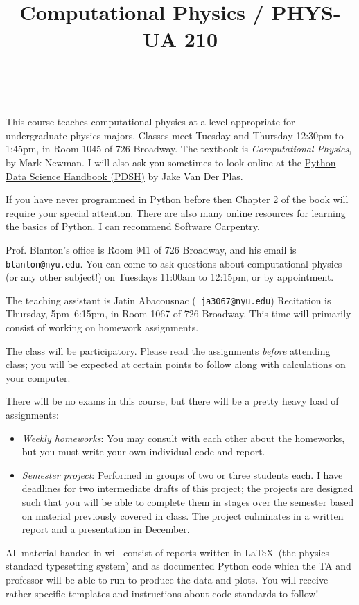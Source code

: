 \documentclass[11pt, preprint]{aastex}
\begin{document}
\title{\bf Computational Physics / PHYS-UA 210}
~
~

\noindent This course teaches computational physics at a level
appropriate for undergraduate physics majors.  Classes meet Tuesday
and Thursday 12:30pm to 1:45pm, in Room 1045 of 726 Broadway.  The
textbook is {\it Computational Physics}, by Mark Newman. I will also
ask you sometimes to look online at the
\href{https://jakevdp.github.io/PythonDataScienceHandbook/}{Python Data Science Handbook (PDSH)} by Jake Van Der Plas.

\noindent If you have never programmed in Python before then Chapter 2
of the book will require your special attention. There are also many
online resources for learning the basics of Python. I can recommend
Software Carpentry.

\noindent Prof. Blanton's office is Room 941 of 726 Broadway, and his
email is {\tt blanton@nyu.edu}. You can come to ask questions about
computational physics (or any other subject!) on Tuesdays 11:00am to
12:15pm, or by appointment.

\noindent The teaching assistant is Jatin Abacousnac ({\tt
  ja3067@nyu.edu}) Recitation is Thursday, 5pm--6:15pm, in Room 1067
of 726 Broadway. This time will primarily consist of working on
homework assignments.

\noindent The class will be participatory. Please read the assignments
          {\it before} attending class; you will be expected at
          certain points to follow along with calculations on your
          computer.

\noindent There will be no exams in this course, but there will be a
pretty heavy load of assignments:
\begin{itemize}
\item {\it Weekly homeworks}: You may consult with each other about
  the homeworks, but you must write your own individual code and
  report.
\item {\it Semester project}: Performed in groups of two or three
  students each. I have deadlines for two intermediate drafts of this
  project; the projects are designed such that you will be able to
  complete them in stages over the semester based on material
  previously covered in class. The project culminates in a written
  report and a presentation in December.
\end{itemize}
All material handed in will consist of reports written in \LaTeX\ (the
physics standard typesetting system) and as documented Python code
which the TA and professor will be able to run to produce the data and
plots. You will receive rather specific templates and instructions
about code standards to follow!
\end{document}
